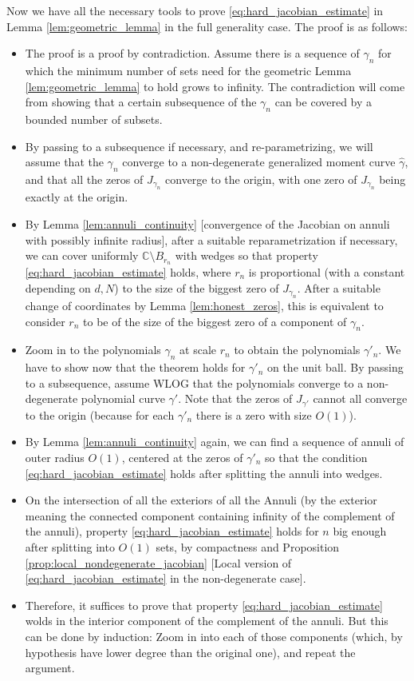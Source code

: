 	Now we have all the necessary tools to prove \eqref{eq:hard_jacobian_estimate} in  Lemma \ref{lem:geometric_lemma} in the full generality case. The proof is as follows:

	\begin{itemize}
		\item The proof is a proof by contradiction. Assume there is a sequence of $\gamma_n$ for which the minimum number of sets need for the geometric Lemma \ref{lem:geometric_lemma} to hold grows to infinity. The contradiction will come from showing that a certain subsequence of the $\gamma_n$ can be covered by a bounded number of subsets.
		\item By passing to a subsequence if necessary, and re-parametrizing, we will assume that the $\gamma_n$ converge to a non-degenerate generalized moment curve $\hat \gamma$, and that all the zeros of $J_{\gamma_n}$ converge to the origin, with one zero of $J_{\gamma_n}$ being exactly at the origin.
		\item By Lemma \ref{lem:annuli_continuity} [convergence of the Jacobian on annuli with possibly infinite radius], after a suitable reparametrization if necessary, we can cover uniformly $\mathbb C\setminus B_{r_n}$ with wedges so that property \eqref{eq:hard_jacobian_estimate} holds, where $r_n$ is proportional (with a constant depending on $d,N$) to the size of the biggest zero of $J_{\gamma_n}$. After a suitable change of coordinates by Lemma \ref{lem:honest_zeros}, this is equivalent to consider $r_n$ to be of the size of the biggest zero of a component of $\gamma_n$.
		\item Zoom in to the polynomials $\gamma_n$ at scale $r_n$ to obtain the polynomials $\gamma'_n$. We have to show now that the theorem holds for $\gamma'_n$ on the unit ball. By passing to a subsequence, assume WLOG that the polynomials converge to a non-degenerate polynomial curve $\gamma'$. Note that the zeros of $J_{\gamma'}$ cannot all converge to the origin (because for each $\gamma'_n$ there is a zero with size $O(1)$). 
		\item By Lemma \ref{lem:annuli_continuity} again, we can find a sequence of annuli of outer radius $O(1)$, centered at the zeros of $\gamma'_n$ so that the condition \eqref{eq:hard_jacobian_estimate} holds after splitting the annuli into wedges.
		\item On the intersection of all the exteriors of all the Annuli (by the exterior meaning the connected component containing infinity of the complement of the annuli), property \eqref{eq:hard_jacobian_estimate} holds for $n$ big enough after splitting into $O(1)$ sets, by compactness and Proposition \ref{prop:local_nondegenerate_jacobian} [Local version of \eqref{eq:hard_jacobian_estimate} in the non-degenerate case].
		\item Therefore, it suffices to prove that property \eqref{eq:hard_jacobian_estimate} wolds in the interior component of the complement of the annuli. But this can be done by induction: Zoom in into each of those components (which, by hypothesis have lower degree than the original one), and repeat the argument.
	\end{itemize}

